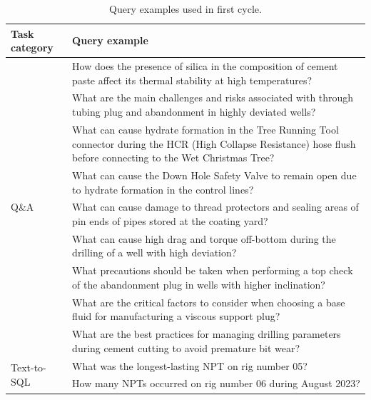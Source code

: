             \begin{table}[h]
                \centering
                \sloppy
                \begin{tabular}{|p{.2\linewidth}|p{.8\linewidth}|}
                    \hline
                    \textbf{Task category} & \textbf{Query example} \\   \hline
                    \multirow{9}{*}{Q\&A} & How does the presence of silica in the composition of cement 
                    paste affect its thermal stability at high temperatures? \\ \cline{2-2}
                    & What are the main challenges and risks associated with through tubing plug and abandonment in highly deviated wells? \\ \cline{2-2}
                    & What can cause hydrate formation in the Tree Running Tool  connector during the HCR (High Collapse Resistance) hose flush  before connecting to the Wet Christmas Tree? \\ \cline{2-2}
                    & What can cause the Down Hole Safety Valve to remain open  due to hydrate formation in the control lines? \\ \cline{2-2}
                    & What can cause damage to thread protectors and sealing  areas of pin ends of pipes stored at the coating yard? \\ \cline{2-2}
                    & What can cause high drag and torque off-bottom during  the drilling of a well with high deviation? \\ \cline{2-2}
                    & What precautions should be taken when performing a top check  of the abandonment plug in wells with higher inclination? \\ \cline{2-2}
                    & What are the critical factors to consider when choosing a base  fluid for manufacturing a viscous support plug? \\ \cline{2-2}
                    & What are the best practices for managing drilling parameters  during cement cutting to avoid premature bit wear? \\ 
                    \hline                
                    \multirow{2}{*}{Text-to-SQL} & What was the longest-lasting NPT on rig number 05? \\ \cline{2-2}
                    & How many NPTs occurred on rig number 06 during August 2023? \\ 
                    \hline
                \end{tabular}
                \fussy
                \caption[Query examples used in first cycle.]{Query examples used in first cycle. }
                \label{table:question_examples}
            \end{table}




